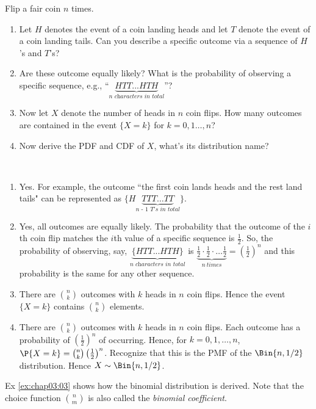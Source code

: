 \begin{exercise}\label{ex:chap03:03}
	Flip a fair coin $n$ times.
	\begin{enumerate}
		\item Let $H$ denotes the event of a coin landing heads and let $T$ denote the event of a coin landing tails. Can you describe a specific outcome via a sequence of $H$'s and $T$'s?
		\item Are these outcome equally likely? What is the probability of observing a specific sequence, e.g., ``$\underbrace{HTT...HTH}_{\textit{n characters in total}}$''?
		\item Now let $X$ denote the number of heads in $n$ coin flips. How many outcomes are contained in the event $\{X=k\}$ for $k = 0, 1 \hdots, n$?
		\item Now derive the PDF and CDF of $X$, what's its distribution name?
	\end{enumerate}
	\begin{solution}~
		\begin{enumerate}
			\item Yes. For example, the outcome ``the first coin lands heads and the rest land tails" can be represented as $\{H\underbrace{TTT \ldots TT}_{\textit{n - 1 T's in total}}\}$.
			\item Yes, all outcomes are equally likely. The probability that the outcome of the $i$th coin flip matches the $i$th value of a specific sequence is $\frac{1}{2}$. So, the probability of observing, say, $\underbrace{\{HTT...HTH\}}_{\textit{n characters in total}}$ is $\underbrace{\frac{1}{2} \cdot \frac{1}{2} \cdot \ldots \frac{1}{2}}_{n \: times} = \left(\frac{1}{2}\right)^n$ and this probability is the same for any other sequence.
			\item There are $\binom{n}{k}$ outcomes with $k$ heads in $n$ coin flips. Hence the event $\{X=k\}$ contains $\binom{n}{k}$ elements.
			\item There are $\binom{n}{k}$ outcomes with $k$ heads in $n$ coin flips. Each outcome has a probability of $\left(\frac{1}{2}\right)^n$ of occurring. Hence, for $k = 0, 1, \hdots, n$, $\P{X = k} = \binom{n}{k} \left(\frac{1}{2}\right)^n$. Recognize that this is the PMF of the $\Bin{n, 1/2}$ distribution. Hence $X \sim \Bin{n, 1/2}$.
		\end{enumerate}
	\end{solution}
\end{exercise}
	
\begin{remark}
	Ex \ref{ex:chap03:03} shows how the binomial distribution is derived. Note that the choice function $\binom{n}{m}$ is also called the \emph{binomial coefficient}. 
\end{remark}

